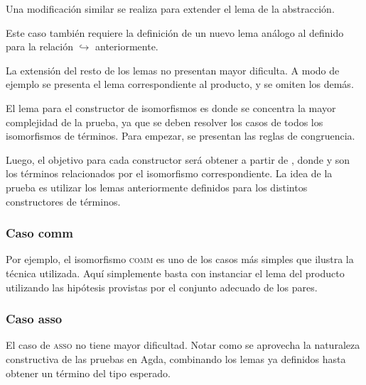Una modificación similar se realiza para extender el lema de la abstracción.


Este caso también requiere la definición de un nuevo lema análogo al definido para la relación $\hookrightarrow$ anteriormente.


La extensión del resto de los lemas no presentan mayor dificulta.
A modo de ejemplo se presenta el lema correspondiente al producto, y se omiten los demás.


El lema para el constructor de isomorfismos es donde se concentra la mayor complejidad de la prueba, ya que se deben resolver los casos de todos los isomorfismos de términos.
Para empezar, se presentan las reglas de congruencia.


Luego, el objetivo para cada constructor será obtener \snstar{} a partir de \snstar{}, donde  y  son los términos relacionados por el isomorfismo correspondiente.
La idea de la prueba es utilizar los lemas anteriormente definidos para los distintos constructores de términos.

\subsubsection{Caso comm}

Por ejemplo, el isomorfismo \textsc{comm} es uno de los casos más simples que ilustra la técnica utilizada.
Aquí simplemente basta con instanciar el lema del producto utilizando las hipótesis provistas por el conjunto adecuado de los pares.


\subsubsection{Caso asso}

El caso de \textsc{asso} no tiene mayor dificultad.
Notar como se aprovecha la naturaleza constructiva de las pruebas en Agda, combinando los lemas ya definidos hasta obtener un término del tipo esperado.


